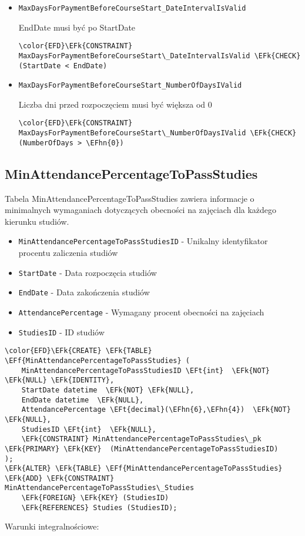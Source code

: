 \documentclass[11pt]{article}
\newcommand{\EFk}[1]{\textcolor{EFk}{\textbf{#1}}} %
\newcommand{\EFf}[1]{\textcolor{EFf}{#1}} %
\newcommand{\EFt}[1]{\textcolor{EFt}{\textbf{#1}}} %
\newcommand{\EFhn}[1]{\textcolor{EFhn}{#1}} %
\begin{document}
\begin{itemize}
\item \texttt{MaxDaysForPaymentBeforeCourseStart\_DateIntervalIsValid}

EndDate musi być po StartDate
\begin{Code}
\begin{Verbatim}
\color{EFD}\EFk{CONSTRAINT} MaxDaysForPaymentBeforeCourseStart\_DateIntervalIsValid \EFk{CHECK}
(StartDate < EndDate)
\end{Verbatim}
\end{Code}
\item \texttt{MaxDaysForPaymentBeforeCourseStart\_NumberOfDaysIValid}

Liczba dni przed rozpoczęciem musi być większa od 0
\begin{Code}
\begin{Verbatim}
\color{EFD}\EFk{CONSTRAINT} MaxDaysForPaymentBeforeCourseStart\_NumberOfDaysIValid \EFk{CHECK}
(NumberOfDays > \EFhn{0})
\end{Verbatim}
\end{Code}
\end{itemize}
\subsection{MinAttendancePercentageToPassStudies}
\label{sec:org37df5cd}
Tabela MinAttendancePercentageToPassStudies zawiera informacje o minimalnych wymaganiach dotyczących obecności na zajęciach dla każdego kierunku studiów.
\begin{itemize}
\item \texttt{MinAttendancePercentageToPassStudiesID} - Unikalny identyfikator procentu zaliczenia studiów
\item \texttt{StartDate} - Data rozpoczęcia studiów
\item \texttt{EndDate} - Data zakończenia studiów
\item \texttt{AttendancePercentage} - Wymagany procent obecności na zajęciach
\item \texttt{StudiesID} - ID studiów
\end{itemize}
\begin{Code}
\begin{Verbatim}
\color{EFD}\EFk{CREATE} \EFk{TABLE} \EFf{MinAttendancePercentageToPassStudies} (
    MinAttendancePercentageToPassStudiesID \EFt{int}  \EFk{NOT} \EFk{NULL} \EFk{IDENTITY},
    StartDate datetime  \EFk{NOT} \EFk{NULL},
    EndDate datetime  \EFk{NULL},
    AttendancePercentage \EFt{decimal}(\EFhn{6},\EFhn{4})  \EFk{NOT} \EFk{NULL},
    StudiesID \EFt{int}  \EFk{NULL},
    \EFk{CONSTRAINT} MinAttendancePercentageToPassStudies\_pk \EFk{PRIMARY} \EFk{KEY}  (MinAttendancePercentageToPassStudiesID)
);
\EFk{ALTER} \EFk{TABLE} \EFf{MinAttendancePercentageToPassStudies} \EFk{ADD} \EFk{CONSTRAINT} MinAttendancePercentageToPassStudies\_Studies
    \EFk{FOREIGN} \EFk{KEY} (StudiesID)
    \EFk{REFERENCES} Studies (StudiesID);
\end{Verbatim}
\end{Code}
Warunki integralnościowe:
\end{document}
